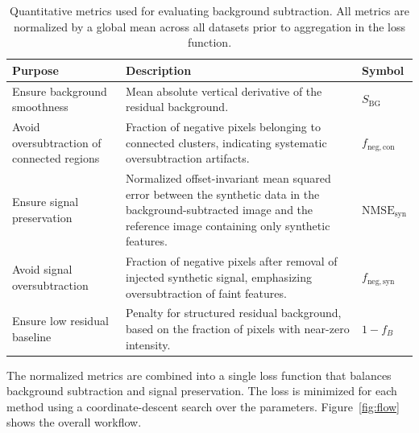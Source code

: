 \documentclass[journal,article,submit,moreauthors]{Definitions/mdpi}
\begin{document}
\begin{table}[htbp]
\caption{Quantitative metrics used for evaluating background subtraction.
All metrics are normalized by a global mean across all datasets prior to aggregation in the loss function.}
\label{tab:loss_terms}
\centering
\footnotesize
\setlength{\tabcolsep}{6pt}
\renewcommand{\arraystretch}{1.1}
\begin{tabular}{@{}p{3.5cm}p{8.0cm}p{1.5cm}@{}}
\toprule
\textbf{Purpose} & \textbf{Description} & \textbf{Symbol} \\
\midrule
Ensure background smoothness  & Mean absolute vertical derivative of the residual background. & $S_{\mathrm{BG}}$ \\
Avoid oversubtraction of connected regions & Fraction of negative pixels belonging to connected clusters, indicating systematic oversubtraction artifacts. & $f_{\mathrm{neg,con}}$ \\
Ensure signal preservation & Normalized offset-invariant mean squared error between the synthetic data in the background-subtracted image and the reference image containing only synthetic features. & $\mathrm{NMSE}_{\mathrm{syn}}$  \\
Avoid signal oversubtraction & Fraction of negative pixels after removal of injected synthetic signal, emphasizing oversubtraction of faint features. & $f_{\mathrm{neg,syn}}$ \\
Ensure low residual baseline & Penalty for structured residual background, based on the fraction of pixels with near-zero intensity. & $1 - f_{B}$ \\
\bottomrule
\end{tabular}
\end{table}

The normalized metrics are combined into a single loss function that balances background subtraction and signal preservation. The loss is minimized for each method using a coordinate-descent search over the parameters. Figure~\ref{fig:flow} shows the overall workflow.
\end{document}
